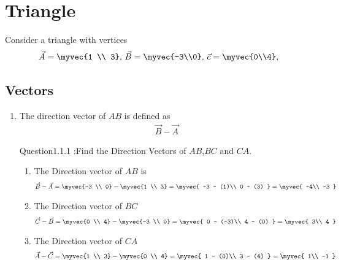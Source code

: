 \documentclass[11pt]{book}
\begin{document}
\frontmatter
\tableofcontents
\setcounter{page}{1}
\mainmatter
\chapter{Triangle}
Consider a triangle with vertices
\begin{align}
\label{eq:tri-pts}
\vec{A}=\myvec{1 \\ 3},\,
\vec{B}=\myvec{-3\\0},\,
	\vec{c}=\myvec{0\\4},\,
\end{align}

\section{Vectors}


\begin{enumerate}[label=\thesection.\arabic*.,ref=\thesection.\theenumi]

\item The direction vector of $AB$ is defined as
		\begin{align}
			\vec{B}-
			\vec{A}
		\end{align}


Question1.1.1 :Find the Direction Vectors of $AB$,$BC$ and $CA$.\\
\solution

\begin{enumerate} 
\item  The Direction vector of $AB$ is \begin{align} &
\vec{B} - \vec{A} = \myvec{-3 \\ 0}-\myvec{1 \\ 3}=\myvec{ -3 - (1)\\ 0 - (3) } = \myvec{ -4\\ -3 }
 \end{align}
 
\item The Direction vector of $BC$ \begin{align}&
\vec{C} - \vec{B} = \myvec{0 \\ 4}-\myvec{-3 \\ 0}=\myvec{ 0 - (-3)\\ 4 - (0) } = \myvec{ 3\\ 4 }
  \end{align}
  
  \item  The Direction vector of $CA$  \begin{align} &
  \vec{A} - \vec{C} = \myvec{1 \\ 3}-\myvec{0 \\ 4}=\myvec{ 1 - (0)\\ 3 - (4) } = \myvec{ 1\\ -1 }
  \end{align}
 \end{enumerate}


\end{enumerate}
\end{document}

